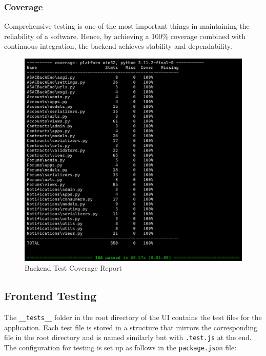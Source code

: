\subsubsection{Coverage}

Comprehensive testing is one of the most important things in maintaining the reliability of a software. Hence, by achieving a 100\% coverage combined with continuous integration, the backend achieves stability and dependability.

\begin{figure}[!ht]
    \centering
    \includegraphics[width=1\textwidth]
    {LATEX/Appendices/Images/Software/Backend/backend_testing_report.png}
    \caption{Backend Test Coverage Report}
    \label{fig:backend_testing}
\end{figure}

\subsection{Frontend Testing}

The \texttt{\_\_tests\_\_} folder in the root directory of the UI contains the test files for the application. Each test file is stored in a structure that mirrors the corresponding file in the root directory and is named similarly but with \texttt{.test.js} at the end. The configuration for testing is set up as follows in the \texttt{package.json} file:

